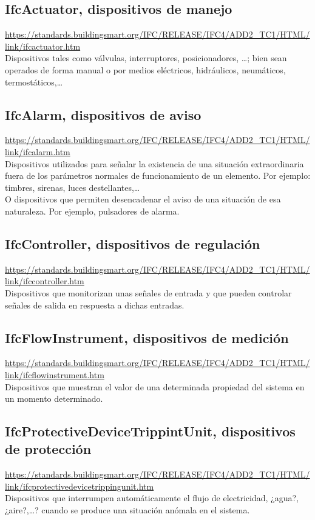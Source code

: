\documentclass[spanish,12pt,a4paper,final,oneside]{book}
\begin{document}
\subsection{IfcActuator, dispositivos de manejo}
\url{https://standards.buildingsmart.org/IFC/RELEASE/IFC4/ADD2_TC1/HTML/link/ifcactuator.htm}
\\Dispositivos tales como válvulas, interruptores, posicionadores, \ldots ; bien sean operados de forma manual o por medios eléctricos, hidráulicos, neumáticos, termostáticos,\ldots

\subsection{IfcAlarm, dispositivos de aviso}
\url{https://standards.buildingsmart.org/IFC/RELEASE/IFC4/ADD2_TC1/HTML/link/ifcalarm.htm}
\\Dispositivos utilizados para señalar la existencia de una situación extraordinaria fuera de los parámetros normales de funcionamiento de un elemento. Por ejemplo: timbres, sirenas, luces destellantes,\ldots
\\O dispositivos que permiten desencadenar el aviso de una situación de esa naturaleza. Por ejemplo, pulsadores de alarma.

\subsection{IfcController, dispositivos de regulación}
\url{https://standards.buildingsmart.org/IFC/RELEASE/IFC4/ADD2_TC1/HTML/link/ifccontroller.htm}
\\Dispositivos que monitorizan unas señales de entrada y que pueden controlar señales de salida en respuesta a dichas entradas.

\subsection{IfcFlowInstrument, dispositivos de medición}
\url{https://standards.buildingsmart.org/IFC/RELEASE/IFC4/ADD2_TC1/HTML/link/ifcflowinstrument.htm}
\\Dispositivos que muestran el valor de una determinada propiedad del sistema en un momento determinado.

\subsection{IfcProtectiveDeviceTrippintUnit, dispositivos de protección}
\url{https://standards.buildingsmart.org/IFC/RELEASE/IFC4/ADD2_TC1/HTML/link/ifcprotectivedevicetrippingunit.htm}
\\Dispositivos que interrumpen automáticamente el flujo de electricidad, ¿agua?, ¿aire?,\ldots? cuando se produce una situación anómala en el sistema.
\end{document}
